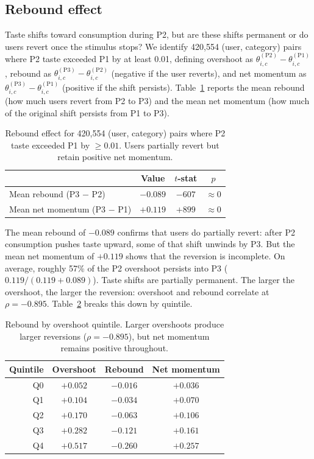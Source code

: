 \documentclass[11pt]{article}
\begin{document}
\subsection{Rebound effect}

Taste shifts toward consumption during P2, but are these shifts permanent or do users revert once the stimulus stops? We identify 420,554 (user, category) pairs where P2 taste exceeded P1 by at least 0.01, defining overshoot as $\theta_{i,c}^{(\text{P2})} - \theta_{i,c}^{(\text{P1})}$, rebound as $\theta_{i,c}^{(\text{P3})} - \theta_{i,c}^{(\text{P2})}$ (negative if the user reverts), and net momentum as $\theta_{i,c}^{(\text{P3})} - \theta_{i,c}^{(\text{P1})}$ (positive if the shift persists). Table~\ref{tab:rebound} reports the mean rebound (how much users revert from P2 to P3) and the mean net momentum (how much of the original shift persists from P1 to P3).

\begin{table}[ht]
\centering
\caption{Rebound effect for 420,554 (user, category) pairs where P2 taste exceeded P1 by $\geq 0.01$. Users partially revert but retain positive net momentum.}
\label{tab:rebound}
\begin{tabular}{lccc}
\toprule
 & Value & $t$-stat & $p$ \\
\midrule
Mean rebound (P3 $-$ P2) & $-0.089$ & $-607$ & $\approx 0$ \\
Mean net momentum (P3 $-$ P1) & $+0.119$ & $+899$ & $\approx 0$ \\
\bottomrule
\end{tabular}
\end{table}
\FloatBarrier

The mean rebound of $-0.089$ confirms that users do partially revert: after P2 consumption pushes taste upward, some of that shift unwinds by P3. But the mean net momentum of $+0.119$ shows that the reversion is incomplete. On average, roughly 57\% of the P2 overshoot persists into P3 ($0.119 / (0.119 + 0.089)$). Taste shifts are partially permanent. The larger the overshoot, the larger the reversion: overshoot and rebound correlate at $\rho = -0.895$. Table~\ref{tab:rebound_quintile} breaks this down by quintile.

\begin{table}[ht]
\centering
\caption{Rebound by overshoot quintile. Larger overshoots produce larger reversions ($\rho = -0.895$), but net momentum remains positive throughout.}
\label{tab:rebound_quintile}
\begin{tabular}{rccc}
\toprule
Quintile & Overshoot & Rebound & Net momentum \\
\midrule
Q0 & $+0.052$ & $-0.016$ & $+0.036$ \\
Q1 & $+0.104$ & $-0.034$ & $+0.070$ \\
Q2 & $+0.170$ & $-0.063$ & $+0.106$ \\
Q3 & $+0.282$ & $-0.121$ & $+0.161$ \\
Q4 & $+0.517$ & $-0.260$ & $+0.257$ \\
\bottomrule
\end{tabular}
\end{table}
\FloatBarrier
\end{document}
